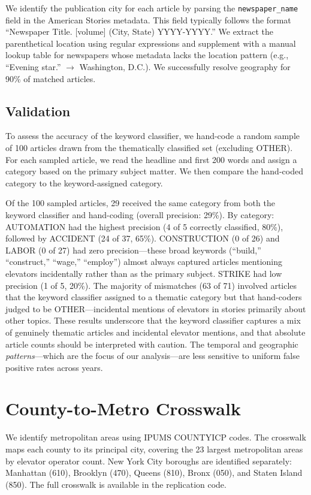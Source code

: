 \documentclass[12pt]{article}
\begin{document}
We identify the publication city for each article by parsing the \texttt{newspaper\_name} field in the American Stories metadata. This field typically follows the format ``Newspaper Title. [volume] (City, State) YYYY-YYYY.'' We extract the parenthetical location using regular expressions and supplement with a manual lookup table for newspapers whose metadata lacks the location pattern (e.g., ``Evening star.'' $\rightarrow$ Washington, D.C.). We successfully resolve geography for 90\% of matched articles.

\subsection{Validation}

To assess the accuracy of the keyword classifier, we hand-code a random sample of 100 articles drawn from the thematically classified set (excluding OTHER). For each sampled article, we read the headline and first 200 words and assign a category based on the primary subject matter. We then compare the hand-coded category to the keyword-assigned category.

Of the 100 sampled articles, 29 received the same category from both the keyword classifier and hand-coding (overall precision: 29\%). By category: AUTOMATION had the highest precision (4 of 5 correctly classified, 80\%), followed by ACCIDENT (24 of 37, 65\%). CONSTRUCTION (0 of 26) and LABOR (0 of 27) had zero precision---these broad keywords (``build,'' ``construct,'' ``wage,'' ``employ'') almost always captured articles mentioning elevators incidentally rather than as the primary subject. STRIKE had low precision (1 of 5, 20\%). The majority of mismatches (63 of 71) involved articles that the keyword classifier assigned to a thematic category but that hand-coders judged to be OTHER---incidental mentions of elevators in stories primarily about other topics. These results underscore that the keyword classifier captures a mix of genuinely thematic articles and incidental elevator mentions, and that absolute article counts should be interpreted with caution. The temporal and geographic \emph{patterns}---which are the focus of our analysis---are less sensitive to uniform false positive rates across years.

\section{County-to-Metro Crosswalk} \label{app:metro}

We identify metropolitan areas using IPUMS COUNTYICP codes. The crosswalk maps each county to its principal city, covering the 23 largest metropolitan areas by elevator operator count. New York City boroughs are identified separately: Manhattan (610), Brooklyn (470), Queens (810), Bronx (050), and Staten Island (850). The full crosswalk is available in the replication code.
\end{document}

